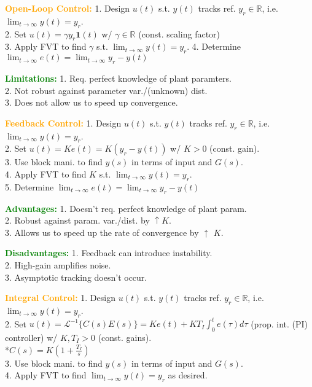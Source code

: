\documentclass[5pt]{extarticle} %
\begin{document}
\begin{paracol}{3}
{    \textcolor{orange}{\textbf{Open-Loop Control:}} 1. Design $u(t)$ s.t. $y(t)$ tracks ref. $y_r \in \mathbb{R}$, i.e. $\lim_{t \rightarrow \infty} y(t) = y_r$. \\
    2. Set $u(t) = \gamma y_r \mathbf{1}(t)$ w/ $\gamma \in \mathbb{R}$ (const. scaling factor) \\
    3. Apply FVT to find $\gamma$ s.t. $\lim_{t \to \infty} y(t) = y_r$.
    4. Determine $\lim_{t \rightarrow \infty} e(t) = \lim_{t \rightarrow \infty} y_r - y(t)$

    \textcolor{green}{\textbf{Limitations:}} 1. Req. perfect knowledge of plant paramters. \\
    2. Not robust against parameter var./(unknown) dist. \\
    3. Does not allow us to speed up convergence. 

    \textcolor{orange}{\textbf{Feedback Control:}} 1. Design $u(t)$ s.t. $y(t)$ tracks ref. $y_r \in \mathbb{R}$, i.e. $\lim_{t \rightarrow \infty} y(t) = y_r$. \\
    2. Set $u(t) = K e(t) = K (y_r - y(t))$ w/ $K>0$ (const. gain). \\ 
    3. Use block mani. to find $y(s)$ in terms of input and $G(s)$. \\
    4. Apply FVT to find $K$ s.t. $\lim_{t \to \infty} y(t) = y_r$. \\
    5. Determine $\lim_{t \rightarrow \infty} e(t) = \lim_{t \rightarrow \infty} y_r - y(t)$

    \textcolor{green}{\textbf{Advantages:}} 1. Doesn't req. perfect knowledge of plant param. \\
    2. Robust against param. var./dist. by $\uparrow K$. \\
    3. Allows us to speed up the rate of convergence by $\uparrow$ $K$.

    \textcolor{green}{\textbf{Disadvantages:}} 1. Feedback can introduce instability. \\
    2. High-gain amplifies noise. \\
    3. Asymptotic tracking doesn't occur. 

    \textcolor{orange}{\textbf{Integral Control:}} 1. Design $u(t)$ s.t. $y(t)$ tracks ref. $y_r \in \mathbb{R}$, i.e. $\lim_{t \rightarrow \infty} y(t) = y_r$. \\
    2. Set $u(t) = \mathcal{L}^{-1} \{C(s)E(s)\} = K e(t) + K T_I \int_0^t e(\tau) d\tau$ (prop. int. (PI) controller) w/ $K, T_I > 0$ (const. gains). \\
    *$C(s) = K \left(1 + \frac{T_I}{s}\right)$ \\
    3. Use block mani. to find $y(s)$ in terms of input and $G(s)$. \\
    4. Apply FVT to find $\lim_{t \to \infty} y(t) = y_r$ as desired. 

}
\end{paracol}
\end{document}
